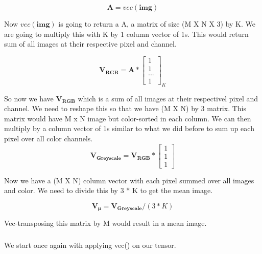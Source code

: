 \documentclass{article}
\newcommand{\matr}[1]{\mathbf{#1}}
\begin{document}
		\begin{equation*}
		\matr{A} = vec(\matr{img})
		\end{equation*}

		Now $vec(\matr{img})$ is going to return a A, a matrix of size (M X N X 3) by K. We are going to multiply this with K by 1 column vector of 1s. 
		This would return sum of all images at their respective pixel and channel.

		\begin{equation*}
		\matr{V_{RGB}} = \matr{A} * 
						\begin{bmatrix} 
						1 \\ 1 \\ ... \\1  
						\end{bmatrix}_{K} 
		\end{equation*}	
		
		So now we have $\matr{V_{RGB}}$ which is a sum of all images at their respectivel pixel and channel. We need to reshape this so that
		we have (M X N) by 3 matrix. This matrix would have M x N image but color-sorted in each column.  
		We can then multiply by a column vector of 1s similar to what we did before to sum up each pixel over all color channels. \\
		
		\begin{equation*}
		\matr{V_{Greyscale}} = \matr{V_{RGB}} *
						\begin{bmatrix} 
						1 \\ 1 \\ 1  
						\end{bmatrix} 
		\end{equation*}	

		Now we have a (M X N) column vector with each pixel summed over all images and color. We need to divide this by 3 * K to get the mean
		image.

		\begin{equation*}
		\matr{V_{\mu}} = \matr{V_{Greyscale}} / (3*K) 
		\end{equation*}	

		Vec-transposing this matrix by M would result in a mean image.

		\subsubsection{} %
	
		We start once again with applying vec() on our tensor.\\
\end{document}
